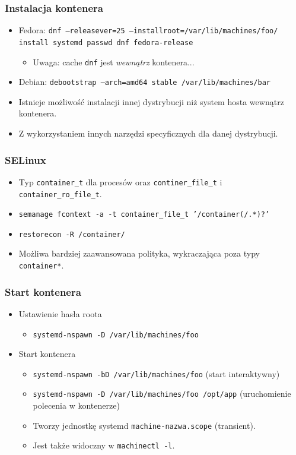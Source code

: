 \documentclass[dvipsnames,table]{beamer}
\begin{document}
\begin{frame}
\frametitle{Instalacja kontenera}
\begin{itemize}
	\item Fedora: {\tt dnf --releasever=25 --installroot=/var/lib/machines/foo/ install systemd passwd dnf fedora-release}
	\begin{itemize}
		\item Uwaga: cache {\tt dnf} jest {\it wewnątrz} kontenera... 
	\end{itemize}
	\item Debian: {\tt debootstrap --arch=amd64 stable /var/lib/machines/bar}
	\item Istnieje możliwość instalacji innej dystrybucji niż system hosta wewnątrz kontenera.
	\item Z wykorzystaniem innych narzędzi specyficznych dla danej dystrybucji.
\end{itemize}
\end{frame}

\begin{frame}
\frametitle{SELinux}
\begin{itemize}
	\item Typ {\tt container\_t} dla procesów oraz {\tt continer\_file\_t} i {\tt container\_ro\_file\_t}.
	\item {\tt semanage fcontext -a -t container\_file\_t '/container(/.*)?'}
	\item {\tt restorecon -R /container/}
	\item Możliwa bardziej zaawansowana polityka, wykraczająca poza typy {\tt container*}.
\end{itemize}	
\end{frame}

\begin{frame}
\frametitle{Start kontenera}
\begin{itemize}
	\item Ustawienie hasła roota
	\begin{itemize}
		\item {\tt systemd-nspawn -D /var/lib/machines/foo}
	\end{itemize}
	\item Start kontenera
	\begin{itemize}
		\item {\tt systemd-nspawn -bD /var/lib/machines/foo} (start interaktywny)
		\item {\tt systemd-nspawn -D /var/lib/machines/foo /opt/app} (uruchomienie polecenia w kontenerze)
		\item Tworzy jednostkę systemd {\tt machine-nazwa.scope} (transient).
		\item Jest także widoczny w {\tt machinectl -l}.
	\end{itemize}	
\end{itemize}
\end{frame}
\end{document}
